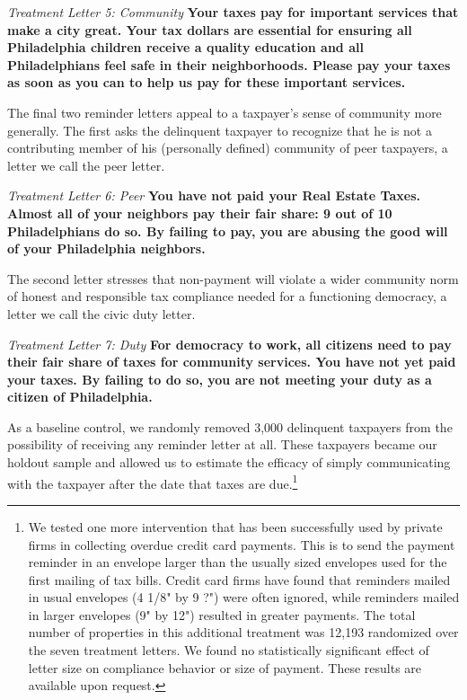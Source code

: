 \documentclass[12pt]{article}
\begin{document}
{\it Treatment Letter 5: Community} {\bf Your taxes pay for important
  services that make a city great. Your tax dollars are essential for
  ensuring all Philadelphia children receive a quality education and
  all Philadelphians feel safe in their neighborhoods. Please pay your
  taxes as soon as you can to help us pay for these important
  services.}

The final two reminder letters appeal to a taxpayer's sense of
community more generally.  The first asks the delinquent taxpayer to
recognize that he is not a contributing member of his (personally
defined) community of peer taxpayers, a letter we call the peer
letter.  

{\it Treatment Letter 6: Peer } {\bf You have not paid your Real
  Estate Taxes. Almost all of your neighbors pay their fair share: 9
  out of 10 Philadelphians do so. By failing to pay, you are abusing
  the good will of your Philadelphia neighbors.}

The second letter stresses that non-payment will violate a wider
community norm of honest and responsible tax compliance needed for a
functioning democracy, a letter we call the civic duty letter. 

{\it Treatment Letter 7: Duty } {\bf For democracy to work, all
  citizens need to pay their fair share of taxes for community
  services. You have not yet paid your taxes. By failing to do so, you
  are not meeting your duty as a citizen of Philadelphia.}


As a baseline control, we randomly removed 3,000 delinquent taxpayers
from the possibility of receiving any reminder letter at all.  These
taxpayers became our holdout sample and allowed us to estimate the
efficacy of simply communicating with the taxpayer after the date that
taxes are due.\footnote{We tested one more intervention that has been
  successfully used by private firms in collecting overdue credit card
  payments.  This is to send the payment reminder in an envelope
  larger than the usually sized envelopes used for the first mailing
  of tax bills.  Credit card firms have found that reminders mailed in
  usual envelopes (4 1/8" by 9 ?") were often ignored, while reminders
  mailed in larger envelopes (9" by 12") resulted in greater payments.
  The total number of properties in this additional treatment was
  12,193 randomized over the seven treatment letters.  We found no
  statistically significant effect of letter size on compliance
  behavior or size of payment.  These results are available upon
  request.}
  
\end{document}

